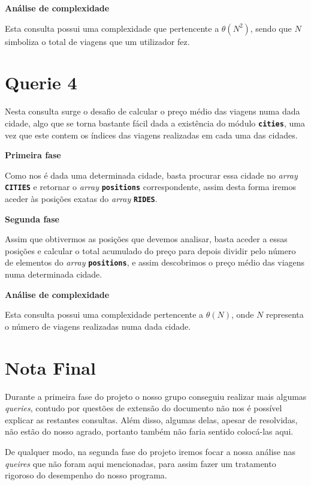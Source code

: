 \documentclass[12pt,a4paper]{report}
\begin{document}
\normalsize\textbf{Análise de complexidade }{\titlerule[0.5pt]}

Esta consulta possui uma complexidade que pertencente a \(\theta(N^2)\), sendo que \(N\) simboliza o total de viagens que um utilizador fez. 


\section{Querie 4}

Nesta consulta surge o desafio de calcular o preço médio das viagens numa dada cidade, algo que se torna bastante fácil dada a existência do módulo \textbf{\small\texttt{cities}}, uma vez que este contem os índices das viagens realizadas em cada uma das cidades.

\normalsize\textbf{Primeira fase }{\titlerule[0.5pt]}

Como nos é dada uma determinada cidade, basta procurar essa cidade no \textit{array} \textbf{\small\texttt{CITIES}} e retornar o \textit{array} \textbf{\small\texttt{positions}} correspondente, assim desta forma iremos aceder às posições exatas do \textit{array} \textbf{\small\texttt{RIDES}}.

\normalsize\textbf{Segunda fase }{\titlerule[0.5pt]}

Assim que obtivermos as posições que devemos analisar, basta aceder a essas posições e calcular o total acumulado do preço para depois dividir pelo número de elementos do \textit{array} \textbf{\small\texttt{positions}}, e assim descobrimos o preço médio das viagens numa determinada cidade.

\normalsize\textbf{Análise de complexidade }{\titlerule[0.5pt]}

Esta consulta possui uma complexidade pertencente a \(\theta(N)\), onde \(N\) representa o número de viagens realizadas numa dada cidade.

\section{Nota Final}

Durante a primeira fase do projeto o nosso grupo conseguiu realizar mais algumas \textit{queries}, contudo por questões de extensão do documento não nos é possível explicar as restantes consultas. Além disso, algumas delas, apesar de resolvidas, não estão do nosso agrado, portanto também não faria sentido colocá-las aqui.

De qualquer modo, na segunda fase do projeto iremos focar a nossa análise nas \textit{queires} que não foram aqui mencionadas, para assim fazer um tratamento rigoroso do desempenho do nosso programa. 
\end{document}
